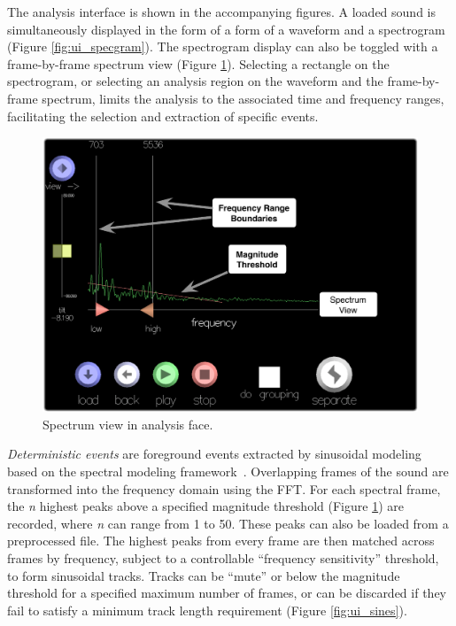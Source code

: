 \documentclass[10pt,letterpaper]{article}
\begin{document}
The analysis interface is shown in the accompanying figures. A loaded sound is simultaneously displayed in the form of a form of a waveform and a spectrogram (Figure \ref{fig:ui_specgram}). The spectrogram display can also be toggled with a frame-by-frame spectrum view (Figure \ref{fig:ui_spectrum}). Selecting a rectangle on
the spectrogram, or selecting an analysis region on the waveform and the
frame-by-frame spectrum, limits the analysis to the associated time and
frequency ranges, facilitating the selection and extraction of
specific events. 

\begin{figure}[h]
  \begin{center}
    \includegraphics[width=.95\columnwidth]{ui_spectrum.pdf}
    \caption{Spectrum view in analysis face.} 
    \label{fig:ui_spectrum}
  \end{center}
\end{figure}

\textit{Deterministic events} are foreground events extracted by
sinusoidal modeling based on the spectral modeling
framework~\cite{Serra89}. Overlapping frames of the sound are
transformed into the frequency domain using the FFT. For each spectral
frame, the \textit{n} highest peaks above a specified magnitude threshold (Figure \ref{fig:ui_spectrum}) are
recorded, where \textit{n} can range from 1 to 50. These peaks can also be loaded
from a preprocessed file. The highest peaks from every frame are then
matched across frames by frequency, subject to a controllable ``frequency
sensitivity'' threshold, to form sinusoidal tracks. Tracks can be ``mute''
or below the magnitude threshold for a specified maximum number of
frames, or can be discarded if they fail to satisfy a minimum track
length requirement (Figure \ref{fig:ui_sines}). 
\end{document}
